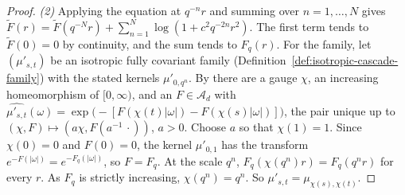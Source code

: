 \begin{proof}
\emph{(2)} Applying the equation at $q^{-n}r$ and summing over $n = 1, \dots, N$ gives
$\widetilde F(r) = \widetilde F(q^{-N}r) + \sum_{n=1}^N\log(1 + c^2q^{-2n}r^2)$. The first term tends
to $\widetilde F(0) = 0$ by continuity, and the sum tends to $F_q(r)$. For the family, let
$(\mu'_{s,t})$ be an isotropic fully covariant family (Definition~\ref{def:isotropic-cascade-family}) with the
stated kernels $\mu'_{0,q^n}$. By  there are a gauge $\chi$, an
increasing homeomorphism of $[0, \infty)$, and an $F \in \mathcal{A}_d$ with
$\widehat{\mu'_{s,t}}(\omega) = \exp\bigl(-[F(\chi(t)|\omega|) - F(\chi(s)|\omega|)]\bigr)$, the pair
unique up to $(\chi, F) \mapsto (a\chi, F(a^{-1}\,\cdot))$, $a > 0$. Choose $a$ so that
$\chi(1) = 1$. Since $\chi(0) = 0$ and $F(0) = 0$, the kernel $\mu'_{0,1}$ has the transform
$e^{-F(|\omega|)} = e^{-F_q(|\omega|)}$, so $F = F_q$. At the scale $q^n$,
$F_q(\chi(q^n)r) = F_q(q^nr)$ for every $r$. As $F_q$ is strictly increasing, $\chi(q^n) = q^n$. So
$\mu'_{s,t} = \mu_{\chi(s),\chi(t)}$.


\end{proof}
